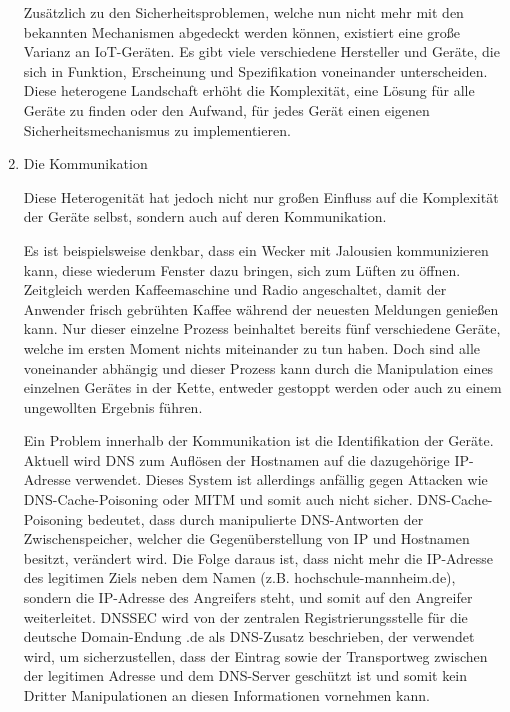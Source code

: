 \begin{enumerate}
            Zusätzlich zu den Sicherheitsproblemen, welche nun nicht mehr mit den bekannten Mechanismen abgedeckt werden können, existiert eine große Varianz an \ac{IoT}-Geräten. Es gibt viele verschiedene Hersteller und Geräte, die sich in Funktion, Erscheinung und Spezifikation voneinander unterscheiden. Diese heterogene Landschaft erhöht die Komplexität, eine Lösung für alle Geräte zu finden oder den Aufwand, für jedes Gerät einen eigenen Sicherheitsmechanismus zu implementieren.
            
            \item Die Kommunikation
            
            Diese Heterogenität hat jedoch nicht nur großen Einfluss auf die Komplexität der Geräte selbst, sondern auch auf deren Kommunikation.
        
            Es ist beispielsweise denkbar, dass ein Wecker mit Jalousien kommunizieren kann, diese wiederum Fenster dazu bringen, sich zum Lüften zu öffnen. Zeitgleich werden Kaffeemaschine und Radio angeschaltet, damit der Anwender frisch gebrühten Kaffee während der neuesten Meldungen genießen kann.
            Nur dieser einzelne Prozess beinhaltet bereits fünf verschiedene Geräte, welche im ersten Moment nichts miteinander zu tun haben. Doch sind alle voneinander abhängig und dieser Prozess kann durch die Manipulation eines einzelnen Gerätes in der Kette, entweder gestoppt werden oder auch zu einem ungewollten Ergebnis führen.
            
            Ein Problem innerhalb der Kommunikation ist die Identifikation der Geräte. Aktuell wird \ac{DNS} zum Auflösen der Hostnamen auf die dazugehörige IP-Adresse verwendet. Dieses System ist allerdings anfällig gegen Attacken wie DNS-Cache-Poisoning oder \ac{MITM} und somit auch nicht sicher.
            DNS-Cache-Poisoning bedeutet, dass durch manipulierte DNS-Antworten der Zwischenspeicher, welcher die Gegenüberstellung von IP und Hostnamen besitzt, verändert wird. Die Folge daraus ist, dass nicht mehr die IP-Adresse des legitimen Ziels neben dem Namen (z.B. hochschule-mannheim.de), sondern die IP-Adresse des Angreifers steht, und somit auf den Angreifer weiterleitet.
            \ac{DNSSEC} wird von der zentralen Registrierungsstelle für die deutsche Domain-Endung \glqq .de\grqq{} \cite{denic_eg}
            als \ac{DNS}-Zusatz beschrieben, der verwendet wird, um sicherzustellen, dass der Eintrag sowie der Transportweg zwischen der legitimen Adresse und dem DNS-Server geschützt ist und somit kein Dritter Manipulationen an diesen Informationen vornehmen kann.
    \end{enumerate}
    

